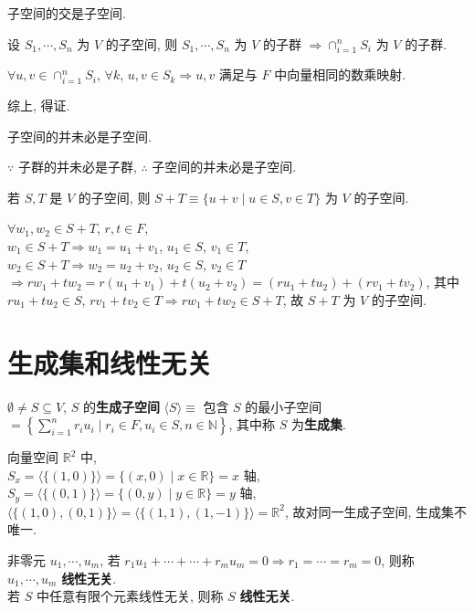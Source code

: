 \documentclass{note}
\begin{document}
子空间的交是子空间.
\begin{pf}
    设 $S_1,\cdots,S_n$ 为 $V$ 的子空间, 则 $S_1,\cdots,S_n$ 为 $V$ 的子群 $\Longrightarrow\cap_{i=1}^nS_i$ 为 $V$ 的子群.

    $\forall u,v\in\cap_{i=1}^nS_i$, $\forall k$, $u,v\in S_k\Longrightarrow u,v$ 满足与 $F$ 中向量相同的数乘映射.

    综上, 得证.
\end{pf}

子空间的并未必是子空间.
\begin{pf}
    $\because$ 子群的并未必是子群, $\therefore$ 子空间的并未必是子空间.
\end{pf}

若 $S,T$ 是 $V$ 的子空间, 则 $S+T\equiv\{u+v\mid u\in S,v\in T\}$ 为 $V$ 的子空间.
\begin{pf}
    $\forall w_1,w_2\in S+T$, $r,t\in F$,\\
    $w_1\in S+T\Longrightarrow w_1=u_1+v_1$, $u_1\in S$, $v_1\in T$,\\
    $w_2\in S+T\Longrightarrow w_2=u_2+v_2$, $u_2\in S$, $v_2\in T$\\
    $\Longrightarrow rw_1+tw_2=r(u_1+v_1)+t(u_2+v_2)=(ru_1+tu_2)+(rv_1+tv_2)$, 其中 $ru_1+tu_2\in S$, $rv_1+tv_2\in T\Longrightarrow rw_1+tw_2\in S+T$, 故 $S+T$ 为 $V$ 的子空间.
\end{pf}

\section{生成集和线性无关}
\begin{df}[生成子空间和生成集]
    $\emptyset\neq S\subseteq V$, $S$ 的\textbf{生成子空间} $\langle S\rangle\equiv$ 包含 $S$ 的最小子空间\\
    $=\left\{\sum_{i=1}^nr_iu_i\mid r_i\in F,u_i\in S,n\in\mathbb{N}\right\}$, 其中称 $S$ 为\textbf{生成集}.
\end{df}

\begin{eg}
    向量空间 $\mathbb{R}^2$ 中,\\
    $S_x=\langle\{(1,0)\}\rangle=\{(x,0)\mid x\in\mathbb{R}\}=x$ 轴,\\
    $S_y=\langle\{(0,1)\}\rangle=\{(0,y)\mid y\in\mathbb{R}\}=y$ 轴,\\
    $\langle\{(1,0),(0,1)\}\rangle=\langle\{(1,1),(1,-1)\}\rangle=\mathbb{R}^2$, 故对同一生成子空间, 生成集不唯一.
\end{eg}

\begin{df}[线性无关]
    非零元 $u_1,\cdots,u_m$, 若 $r_1u_1+\cdots+\cdots+r_mu_m=0\Longrightarrow r_1=\cdots=r_m=0$, 则称 $u_1,\cdots,u_m$ \textbf{线性无关}.\\
    若 $S$ 中任意有限个元素线性无关, 则称 $S$ \textbf{线性无关}.
\end{df}
\end{document}
